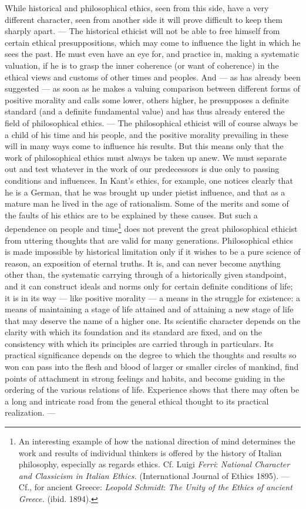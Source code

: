 \documentclass[12pt,a4paper,openany]{book}
\newcommand{\opage}[1]{\marginnote{\footnotesize\textit{[#1]}}}
\begin{document}
While historical and philosophical ethics, seen from this side, have a very different character,
seen from another side it will prove difficult to keep them sharply apart. --- The historical
ethicist will not be able to free himself from certain ethical presuppositions, which may come to
influence the light in which he sees the past. He must even have an eye for, and practice in,
making a systematic valuation, if he is to grasp the inner coherence (or want of coherence) in the
ethical views and customs of other times and peoples. And --- as has already been suggested --- as
soon as he makes a valuing comparison between different forms of positive morality and calls some
lower, others higher, he presupposes a definite standard (and a definite fundamental value) and has
thus already entered the field of philosophical ethics. --- The philosophical ethicist will of
course always be a child of his time and his people, and the positive morality prevailing in these
will in many ways come to influence his results. But this means only that the work of philosophical
ethics must always be taken up anew. We must separate out and test whatever in the work of our
predecessors is due only to passing conditions and influences. In Kant's ethics, for example,
one notices clearly that he is a German, that he was brought up under pietist influence, and that
as a mature man he lived in the age of rationalism. Some of the merits and some of the faults of his
ethics are to be explained by these causes. But such a dependence on people and
\opage{12}time\footnote[1]{An interesting example of how the national direction of mind determines the work and
results of individual thinkers is offered by the history of Italian philosophy, especially as
regards ethics. Cf. Luigi \emph{Ferri}: \textit{National Character and Classicism in Italian
Ethics.} (International Journal of Ethics 1895). --- Cf., for ancient Greece: \emph{Leopold
Schmidt}: \textit{The Unity of the Ethics of ancient Greece.} (ibid. 1894).} does not prevent the
great philosophical ethicist from uttering thoughts that are valid for many generations.
Philosophical ethics is made impossible by historical limitation only if it wishes to be a pure
science of reason, an exposition of eternal truths. It is, and can never become anything other
than, the systematic carrying through of a historically given standpoint, and it can construct
ideals and norms only for certain definite conditions of life; it is in its way --- like positive
morality --- a means in the struggle for existence: a means of maintaining a stage of life
attained and of attaining a new stage of life that may deserve the name of a higher one. Its
scientific character depends on the clarity with which its foundation and its standard are fixed,
and on the consistency with which its principles are carried through in particulars. Its practical
significance depends on the degree to which the thoughts and results so won can pass into the flesh
and blood of larger or smaller circles of mankind, find points of attachment in strong feelings and
habits, and become guiding in the ordering of the various relations of life. Experience shows that
there may often be a long and intricate road from the general ethical thought to its practical
realization. ---
\end{document}
